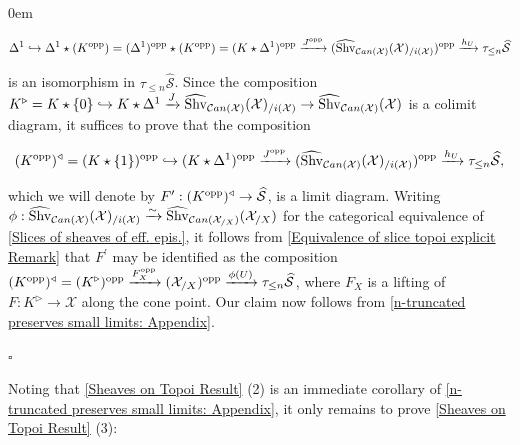\documentclass[10pt]{article}
\newcommand{\mS}{\mathcal S}
\newcommand{\C}{\mathcal C}
\newcommand{\cX}{\mathcal{X}}
\renewcommand{\qed}{\hfill$\square$}
\renewenvironment{proof}{\begin{addmargin}[1em]{0em}\begin{newproof}}{\end{newproof}\end{addmargin}\qed}
\theoremstyle{witharg}
\theoremstyle{witharg}
\theoremstyle{witharg2}
\begin{document}
\begin{proof}
$$\Delta^1\hookrightarrow \Delta^1\star (K^\textnormal{opp})=(\Delta^1)^\textnormal{opp}\star (K^\textnormal{opp})=(K\star \Delta^1)^{\textnormal{opp}}\xrightarrow{J^{\textnormal{opp}}}(\widehat{\textnormal{Shv}}_{\C an(\cX)}(\cX)_{/i(\cX)})^{\textnormal{opp}}\xrightarrow{h_U}\tau_{\leq n}\widehat{\mS}$$

\noindent is an isomorphism in $\tau_{\leq n}\widehat{\mS}$. Since the composition $K^\triangleright=K\star \{0\}\hookrightarrow K\star \Delta^1\xrightarrow{J}\widehat{\textnormal{Shv}}_{\C an(\cX)}(\cX)_{/i(\cX)}\rightarrow \widehat{\textnormal{Shv}}_{\C an(\cX)}(\cX)$ is a colimit diagram, it suffices to prove that the composition 

$$(K^{\textnormal{opp}})^\triangleleft=(K\star \{1\})^{\textnormal{opp}}\hookrightarrow (K\star \Delta^1)^{\textnormal{opp}}\xrightarrow{J^{\textnormal{opp}}}(\widehat{\textnormal{Shv}}_{\C an(\cX)}(\cX)_{/i(\cX)})^{\textnormal{opp}}\xrightarrow{h_U}\tau_{\leq n}\widehat{\mS},$$


\noindent which we will denote by $F^\prime:(K^{\textnormal{opp}})^\triangleleft\rightarrow \widehat{\mS}$, is a limit diagram. Writing $\phi:\widehat{\textnormal{Shv}}_{\C an(\cX)}(\cX)_{/i(\cX)}\xrightarrow{\sim}\widehat{\textnormal{Shv}}_{\C an(\cX_{/X})}(\cX_{/X})$ for the categorical equivalence of \ref{Slices of sheaves of eff. epis.}, it follows from \ref{Equivalence of slice topoi explicit Remark} that $F^\prime$ may be identified as the composition $(K^{\textnormal{opp}})^\triangleleft=(K^\triangleright)^{\textnormal{opp}}\xrightarrow{F_X^{\textnormal{opp}}}(\cX_{/X})^\textnormal{opp}\xrightarrow{\phi(U)}\tau_{\leq n}\widehat{\mS}$, where $F_X$ is a lifting of $F:K^\triangleright\rightarrow \cX$ along the cone point. Our claim now follows from \ref{n-truncated preserves small limits: Appendix}. 




\end{proof}


\noindent Noting that \ref{Sheaves on Topoi Result} (2) is an immediate corollary of \ref{n-truncated preserves small limits: Appendix}, it only remains to prove \ref{Sheaves on Topoi Result} (3):
\end{document}
